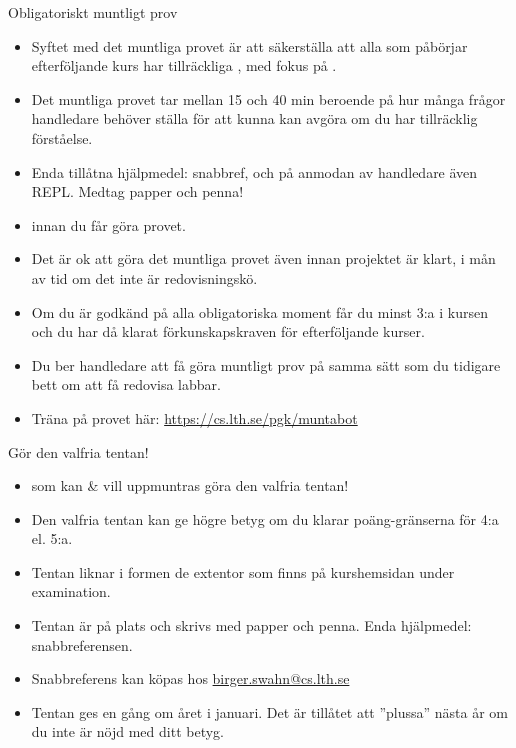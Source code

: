 \begin{SlideExtra}{Obligatoriskt muntligt prov}
\begin{itemize}\SlideFontSmall
  \item Syftet med det muntliga provet är att säkerställa att alla som påbörjar efterföljande kurs har tillräckliga , med fokus på .
  \item Det muntliga provet tar mellan 15 och 40 min beroende på hur många frågor handledare behöver ställa för att kunna kan avgöra om du har tillräcklig förståelse.
  \item Enda tillåtna hjälpmedel: snabbref, och på anmodan av handledare även REPL. Medtag papper och penna!
  \item {} innan du får göra  provet.
  \item Det är ok att göra det muntliga provet även innan projektet är klart, i mån av tid om  det inte är redovisningskö.
  \item Om du är godkänd på alla obligatoriska moment får du minst 3:a i kursen och du har då klarat förkunskapskraven för efterföljande kurser.
  \item Du ber handledare att få göra muntligt prov på samma sätt som du tidigare bett om att få redovisa labbar.
  \item Träna på provet här: \url{https://cs.lth.se/pgk/muntabot}
\end{itemize}  
\end{SlideExtra}

\begin{SlideExtra}{Gör den valfria tentan!}
\begin{itemize}
  \item {} som kan \& vill uppmuntras göra den valfria tentan!
  \item Den valfria tentan kan ge högre betyg om du klarar poäng-gränserna för 4:a el. 5:a.
  \item Tentan liknar i formen de extentor som finns på kurshemsidan under examination.
  \item Tentan är på plats och skrivs med papper och penna. Enda hjälpmedel: snabbreferensen.
  \item Snabbreferens kan köpas hos \url{birger.swahn@cs.lth.se}
  \item Tentan ges en gång om året i januari. Det är tillåtet att ''plussa'' nästa år om du inte är nöjd med ditt betyg.
\end{itemize}
\end{SlideExtra}




